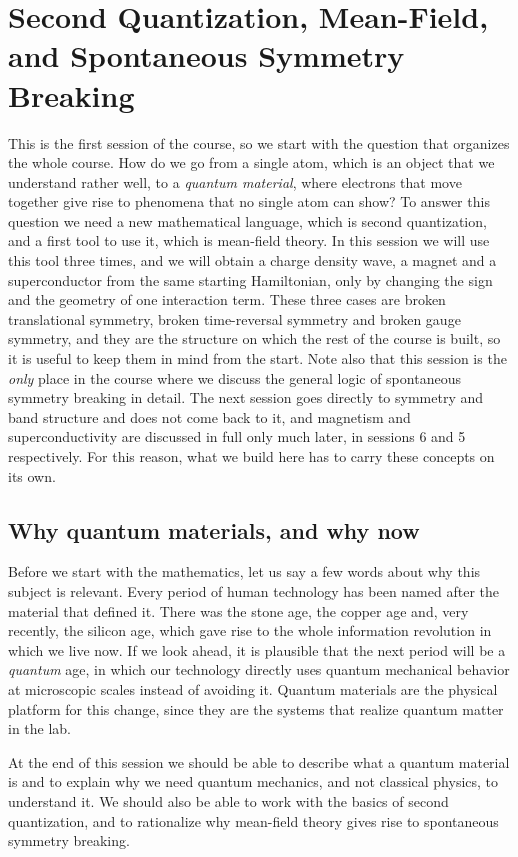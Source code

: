 \chapter{Second Quantization, Mean-Field, and Spontaneous Symmetry Breaking}

This is the first session of the course, so we start with the question that organizes the whole course. How do we go from a single atom, which
is an object that we understand rather well, to a \emph{quantum material}, where electrons that move
together give rise to phenomena that no single atom can show? To answer this question we need a new
mathematical language, which is second quantization, and a first tool to use it, which is
mean-field theory. In this session we will use this tool three times, and we will obtain a charge
density wave, a magnet and a superconductor from the same starting Hamiltonian, only by changing
the sign and the geometry of one interaction term. These three cases are broken translational
symmetry, broken time-reversal symmetry and broken gauge symmetry, and they are the structure on
which the rest of the course is built, so it is useful to keep them in mind from the start. Note
also that this session is the \emph{only} place in the course where we discuss the general logic of
spontaneous symmetry breaking in detail. The next session goes directly to symmetry and band
structure and does not come back to it, and magnetism and superconductivity are discussed in full
only much later, in sessions 6 and 5 respectively. For this reason, what we build here has to
carry these concepts on its own.

\section{Why quantum materials, and why now}

Before we start with the mathematics, let us say a few words about why this subject is relevant.
Every period of human technology has been named after the material that defined it. There was the
stone age, the copper age and, very recently, the silicon age, which gave rise to the whole
information revolution in which we live now. If we look ahead, it is plausible that the next period
will be a \emph{quantum} age, in which our technology directly uses quantum mechanical behavior at
microscopic scales instead of avoiding it. Quantum materials are the physical platform for this
change, since they are the systems that realize quantum matter in the lab.

At the end of this session we should be able to describe what a quantum
material is and to explain why we need quantum mechanics, and not classical physics, to understand
it. We should also be able to work with the basics of second quantization, and to rationalize why
mean-field theory gives rise to spontaneous symmetry breaking.

